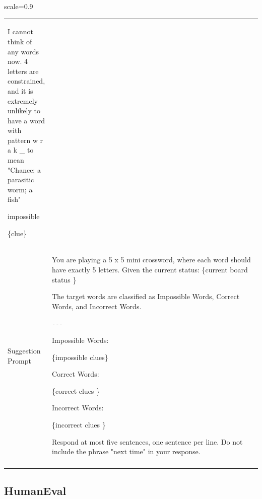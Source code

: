 \documentclass{article}
\theoremstyle{plain}
\theoremstyle{definition}
\theoremstyle{remark}
\begin{document}
\begin{table}[h!]
\begin{adjustbox}{scale=0.9}
\begin{tabular}{|p{0.15\linewidth}|p{0.85\linewidth}|}
I cannot think of any words now. 4 letters are constrained, and it is extremely unlikely to have a word with pattern w r a k \_ to mean "Chance; a parasitic worm; a fish"

impossible

\{clue\}
 \\
    \Xhline{1.2pt}
    Suggestion Prompt &You are playing a 5 x 5 mini crossword, where each word should have exactly 5 letters.
Given the current status:
\{current board status \}

The target words are classified as Impossible Words, Correct Words, and Incorrect Words.

\texttt{-{}-{}-}

Impossible Words:

\{impossible clues\} 

Correct Words:

\{correct clues \} 

Incorrect Words:

\{incorrect clues \} 

Respond at most five sentences, one sentence per line.
Do not include the phrase "next time" in your response.
       \\  \Xhline{1.2pt}
  \end{tabular}
\end{adjustbox}
\end{table}

\subsection{HumanEval}
\end{document}
